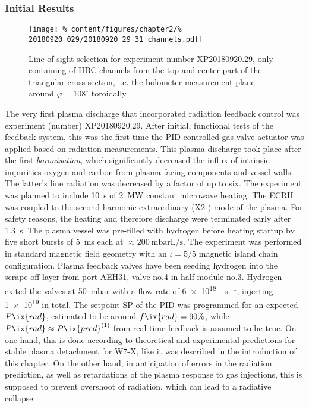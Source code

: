        \subsubsection*{Initial Results}%
%
            \begin{figure}[t]%
                \centering%
                \captionsetup{width=.45\textwidth}%
                \begin{minipage}[c]{0.45\textwidth}%
                    \caption{Line of sight selection for experiment number XP20180920.29, only containing of HBC channels from the top and center part of the triangular cross-section, i.e. the bolometer measurement plane around $\varphi=108^{\circ}$ toroidally.}\label{fig:20180920.29_channels}%
                \end{minipage}%
                \hfill%
                \begin{minipage}[c]{0.5\textwidth}%
                    \texttt{[image: \%
                        content/figures/chapter2/\%
                        20180920\_029/20180920\_29\_31\_channels.pdf]}%
                \end{minipage}%
            \end{figure}%
%
            The very first plasma discharge that incorporated radiation feedback control was experiment (number) XP20180920.29. After initial, functional tests of the feedback system, this was the first time the PID controlled gas valve actuator was applied based on radiation measurements. This plasma discharge took place after the first \textit{boronisation}, which significantly decreased the influx of intrinsic impurities oxygen and carbon from plasma facing components and vessel walls. The latter's line radiation was decreased by a factor of up to six\cite{Wang2020}. The experiment was planned to include \SI{10}{\second} of \SI{2}{\mega\watt} constant microwave heating. The ECRH was coupled to the second-harmonic extraordinary (X2-) mode of the plasma. For safety reasons, the heating and therefore discharge were terminated early after \SI{1.3}{\second}. The plasma vessel was pre-filled with hydrogen before heating startup by five short bursts of \SI{5}{\milli\second} each at $\approx\SI{200}{\milli\bar\liter\per\second}$. The experiment was performed in standard magnetic field geometry with an $\iota=5/5$ magnetic island chain configuration. Plasma feedback valves have been seeding hydrogen into the scrape-off layer from port AEH31, valve no.4 in half module no.3. Hydrogen exited the valves at \SI{50}{\milli\bar} with a flow rate of \SI{6e18}{\atom\per\second}, injecting \SI{1e19}{\atom} in total. The setpoint SP of the PID was programmed for an expected $P\ix{rad}$, estimated to be around $f\ix{rad}=90\%$, while $P\ix{rad}\approx P\ix{pred}^{\left(1\right)}$ from real-time feedback is assumed to be true. On one hand, this is done according to theoretical and experimental predictions for stable plasma detachment for W7-X, like it was described in the introduction of this chapter. On the other hand, in anticipation of errors in the radiation prediction, as well as retardations of the plasma response to gas injections, this is supposed to prevent overshoot of radiation, which can lead to a radiative collapse.\\%
